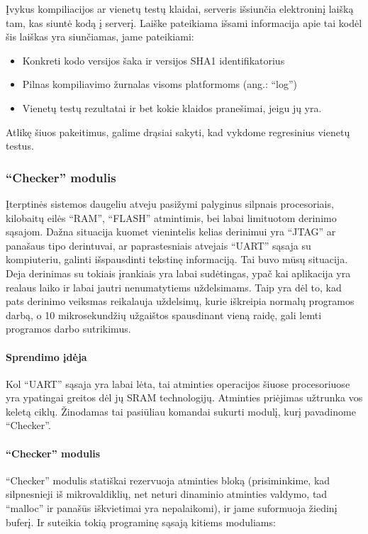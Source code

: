 \documentclass[12pt, a4paper, lithuanian, final]{article}
\begin{document}
Įvykus kompiliacijos ar vienetų testų klaidai, serveris išsiunčia elektroninį laišką tam, kas siuntė kodą į serverį.
Laiške pateikiama išsami informacija apie tai kodėl šis laiškas yra siunčiamas, jame pateikiami:
\begin{itemize}
	\item Konkreti kodo versijos šaka ir versijos SHA1 identifikatorius
	\item Pilnas kompiliavimo žurnalas visoms platformoms (ang.: "`log"')
	\item Vienetų testų rezultatai ir bet kokie klaidos pranešimai, jeigu jų yra.
\end{itemize}


Atlikę šiuos pakeitimus, galime drąsiai sakyti, kad vykdome regresinius vienetų testus.





\subsubsection{"`Checker"' modulis}

Įterptinės sistemos daugeliu atveju pasižymi palyginus silpnais procesoriais, kilobaitų eilės "`RAM"', "`FLASH"' atmintimis, bei labai limituotom derinimo sąsajom.
Dažna situacija kuomet vienintelis kelias derinimui yra "`JTAG"' ar panašaus tipo derintuvai, ar paprastesniais atvejais "`UART"' sąsaja su kompiuteriu, galinti išspausdinti tekstinę informaciją.
Tai buvo mūsų situacija.
Deja derinimas su tokiais įrankiais yra labai sudėtingas, ypač kai aplikacija yra realaus laiko ir labai jautri nenumatytiems uždelsimams.
Taip yra dėl to, kad pats derinimo veiksmas reikalauja uždelsimų, kurie iškreipia normalų programos darbą, o 10 mikrosekundžių užgaištos spausdinant vieną raidę, gali lemti programos darbo sutrikimus.

\paragraph{Sprendimo įdėja}

Kol "`UART"' sąsaja yra labai lėta, tai atminties operacijos šiuose procesoriuose yra ypatingai greitos dėl jų SRAM technologijų.
Atminties priėjimas užtrunka vos keletą ciklų.
Žinodamas tai pasiūliau komandai sukurti modulį, kurį pavadinome "`Checker"'.


\paragraph{"`Checker"' modulis}
"`Checker"' modulis statiškai rezervuoja atminties bloką (prisiminkime, kad silpnesnieji iš mikrovaldiklių, net neturi dinaminio atminties valdymo, tad "`malloc"' ir panašūs iškvietimai yra nepalaikomi), ir jame suformuoja žiedinį buferį.
Ir suteikia tokią programinę sąsają kitiems moduliams:
\end{document}
